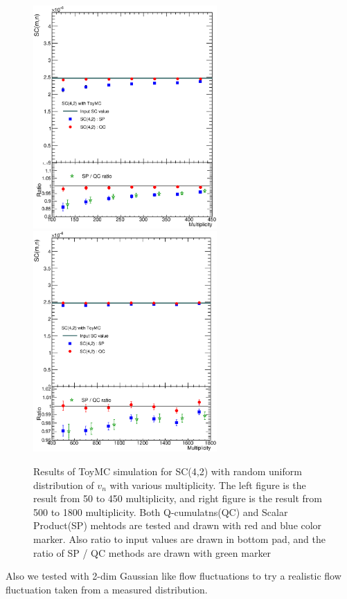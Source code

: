 \begin{figure}[h]
\centerline{\includegraphics[width=7.0cm]{figures/figs_ToyMC/SC_Comparison_SC42_ToyMC_low_woJet}
\includegraphics[width=7.0cm]{figures/figs_ToyMC/SC_Comparison_SC42_highonly_ToyMC_woJet}}
\caption{Results of ToyMC simulation for SC(4,2) with random uniform distribution of $v_n$ with various multiplicity. The left figure is the result from 50 to 450 multiplicity, and right figure is the result from 500 to 1800 multiplicity. Both Q-cumulatns(QC) and Scalar Product(SP) mehtods are tested and drawn with red and blue color marker. Also ratio to input values are drawn in bottom pad, and the ratio of SP / QC methods are drawn with green marker}
\label{fig:ToyMC_Uniform_SC42_woJet}
\end{figure}



Also we tested with 2-dim Gaussian like flow fluctuations to try a realistic flow fluctuation taken from a measured distribution.

